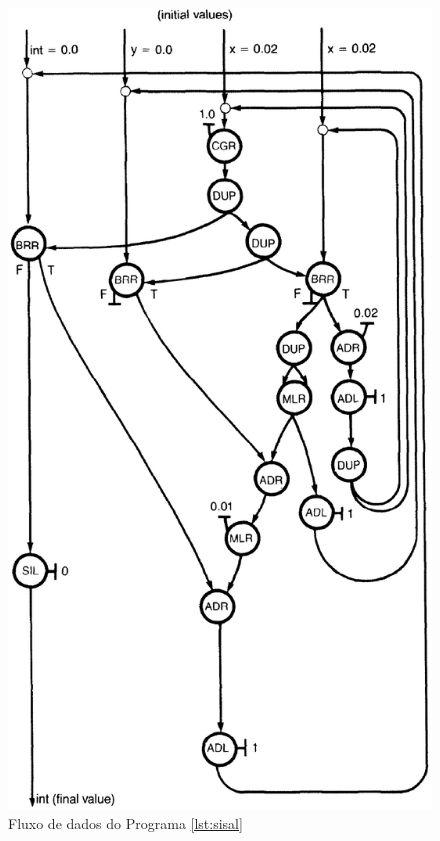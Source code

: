 \documentclass{beamer}
\begin{document}
\begin{frame}
	\begin{figure}
		\centering
		\caption{Fluxo de dados do Programa \ref{lst:sisal}}
		\label{fig:dataflow}
		\includegraphics[height=.87\textheight]{programa}
	\end{figure}
\end{frame}
\end{document}
